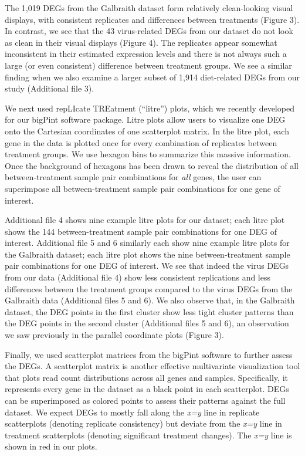 \documentclass{bmcart}
\begin{document}
\begin{linenumbers}
\begin{doublespacing}
The 1,019 DEGs from the Galbraith dataset form relatively clean-looking visual displays, with consistent replicates and differences between treatments (Figure 3). In contrast, we see that the 43 virus-related DEGs from our dataset do not look as clean in their visual displays (Figure 4). The replicates appear somewhat inconsistent in their estimated expression levels and there is not always such a large (or even consistent) difference between treatment groups. We see a similar finding when we also examine a larger subset of 1,914 diet-related DEGs from our study (Additional file 3).

We next used repLIcate TREatment (``litre'') plots, which we recently developed for our bigPint software package. Litre plots allow users to visualize one DEG onto the Cartesian coordinates of one scatterplot matrix. In the litre plot, each gene in the data is plotted once for every combination of replicates between treatment groups. We use hexagon bins to summarize this massive information. Once the background of hexagons has been drawn to reveal the distribution of all between-treatment sample pair combinations for \textit{all} genes, the user can superimpose all between-treatment sample pair combinations for one gene of interest.

Additional file 4 shows nine example litre plots for our dataset; each litre plot shows the 144 between-treatment sample pair combinations for one DEG of interest. Additional file 5 and 6 similarly each show nine example litre plots for the Galbraith dataset; each litre plot shows the nine between-treatment sample pair combinations for one DEG of interest. We see that indeed the virus DEGs from our data (Additional file 4) show less consistent replications and less differences between the treatment groups compared to the virus DEGs from the Galbraith data (Additional files 5 and 6). We also observe that, in the Galbraith dataset, the DEG points in the first cluster show less tight cluster patterns than the DEG points in the second cluster (Additional files 5 and 6), an observation we saw previously in the parallel coordinate plots (Figure 3).

Finally, we used scatterplot matrices from the bigPint software to further assess the DEGs. A scatterplot matrix is another effective multivariate visualization tool that plots read count distributions across all genes and samples. Specifically, it represents every gene in the dataset as a black point in each scatterplot. DEGs can be superimposed as colored points to assess their patterns against the full dataset. We expect DEGs to mostly fall along the \textit{x=y} line in replicate scatterplots (denoting replicate consistency) but deviate from the \textit{x=y} line in treatment scatterplots (denoting significant treatment changes). The \textit{x=y} line is shown in red in our plots.


\end{doublespacing}
\end{linenumbers}
\end{document}
